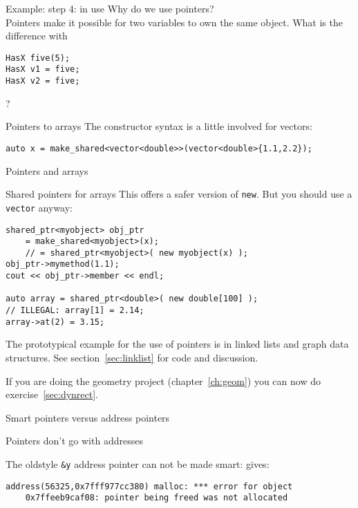 \begin{block}{Example: step 4: in use}
  \label{sl:pointwhy}
  Why do we use pointers?\\
  Pointers make it possible for two variables to own the same object.
  What is the difference with
\begin{lstlisting}
HasX five(5);
HasX v1 = five;
HasX v2 = five;
\end{lstlisting}
?
\end{block}

\begin{block}{Pointers to arrays}
  \label{sl:shared-vector}
  The constructor syntax is a little involved for vectors:
\begin{lstlisting}
auto x = make_shared<vector<double>>(vector<double>{1.1,2.2});
\end{lstlisting}
\end{block}

 {Pointers and arrays}

\begin{slide}{Shared pointers for arrays}
This offers a safer version of \lstinline{new}. But you should use a
\lstinline{vector} anyway:
\begin{lstlisting}
shared_ptr<myobject> obj_ptr
    = make_shared<myobject>(x);
    // = shared_ptr<myobject>( new myobject(x) );
obj_ptr->mymethod(1.1);
cout << obj_ptr->member << endl;

auto array = shared_ptr<double>( new double[100] );
// ILLEGAL: array[1] = 2.14;
array->at(2) = 3.15;
\end{lstlisting}
\end{slide}

The prototypical example for the use of pointers is in
linked lists and graph data structures.
See section~\ref{sec:linklist} for code and discussion.

\begin{exercise}
  If you are doing the geometry project (chapter~\ref{ch:geom})
  you can now do exercise~\ref{sec:dynrect}.
\end{exercise}

 {Smart pointers versus address pointers}

\begin{block}{Pointers don't go with addresses}
  \label{sl:shareaddress}

  The oldstyle \lstinline{&y} address pointer can not be made smart:
  gives:
  {\small
\begin{verbatim}
address(56325,0x7fff977cc380) malloc: *** error for object
    0x7ffeeb9caf08: pointer being freed was not allocated
\end{verbatim}
}
\end{block}

